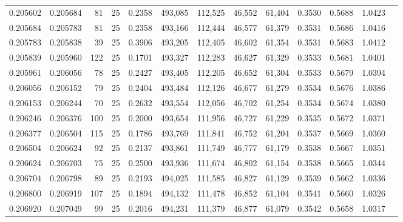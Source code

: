 \begin{tabular}{rrrrrrrrrrrrr}
0.205602 & 0.205684 &    81 &  25 &                                     0.2358 & 493,085 & 112,525 &  46,552 &  61,404 & 0.3530 & 0.5688 & 1.0423 \\
0.205684 & 0.205783 &    81 &  25 &                                     0.2358 & 493,166 & 112,444 &  46,577 &  61,379 & 0.3531 & 0.5686 & 1.0416 \\
0.205783 & 0.205838 &    39 &  25 &                                     0.3906 & 493,205 & 112,405 &  46,602 &  61,354 & 0.3531 & 0.5683 & 1.0412 \\
0.205839 & 0.205960 &   122 &  25 &                                     0.1701 & 493,327 & 112,283 &  46,627 &  61,329 & 0.3533 & 0.5681 & 1.0401 \\
0.205961 & 0.206056 &    78 &  25 &                                     0.2427 & 493,405 & 112,205 &  46,652 &  61,304 & 0.3533 & 0.5679 & 1.0394 \\
0.206056 & 0.206152 &    79 &  25 &                                     0.2404 & 493,484 & 112,126 &  46,677 &  61,279 & 0.3534 & 0.5676 & 1.0386 \\
0.206153 & 0.206244 &    70 &  25 &                                     0.2632 & 493,554 & 112,056 &  46,702 &  61,254 & 0.3534 & 0.5674 & 1.0380 \\
0.206246 & 0.206376 &   100 &  25 &                                     0.2000 & 493,654 & 111,956 &  46,727 &  61,229 & 0.3535 & 0.5672 & 1.0371 \\
0.206377 & 0.206504 &   115 &  25 &                                     0.1786 & 493,769 & 111,841 &  46,752 &  61,204 & 0.3537 & 0.5669 & 1.0360 \\
0.206504 & 0.206624 &    92 &  25 &                                     0.2137 & 493,861 & 111,749 &  46,777 &  61,179 & 0.3538 & 0.5667 & 1.0351 \\
0.206624 & 0.206703 &    75 &  25 &                                     0.2500 & 493,936 & 111,674 &  46,802 &  61,154 & 0.3538 & 0.5665 & 1.0344 \\
0.206704 & 0.206798 &    89 &  25 &                                     0.2193 & 494,025 & 111,585 &  46,827 &  61,129 & 0.3539 & 0.5662 & 1.0336 \\
0.206800 & 0.206919 &   107 &  25 &                                     0.1894 & 494,132 & 111,478 &  46,852 &  61,104 & 0.3541 & 0.5660 & 1.0326 \\
0.206920 & 0.207049 &    99 &  25 &                                     0.2016 & 494,231 & 111,379 &  46,877 &  61,079 & 0.3542 & 0.5658 & 1.0317 \\

\end{tabular}

